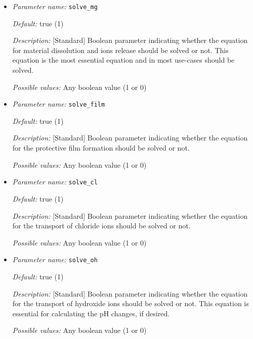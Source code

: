 \begin{itemize}
\item {\it Parameter name:} {\tt solve\_mg}
\label{parameters:solve_mg}


{\it Default:} true (1)

{\it Description:} [Standard] Boolean parameter indicating whether the equation for material dissolution and ions release should be solved or not. This equation is the most essential equation and in most use-cases should be solved.

{\it Possible values:} Any boolean value (1 or 0)


\item {\it Parameter name:} {\tt solve\_film}
\label{parameters:solve_film}


{\it Default:} true (1)

{\it Description:} [Standard] Boolean parameter indicating whether the equation for the protective film formation should be solved or not.

{\it Possible values:} Any boolean value (1 or 0)


\item {\it Parameter name:} {\tt solve\_cl}
\label{parameters:solve_cl}


{\it Default:} true (1)

{\it Description:} [Standard] Boolean parameter indicating whether the equation for the transport of chloride ions should be solved or not.

{\it Possible values:} Any boolean value (1 or 0)


\item {\it Parameter name:} {\tt solve\_oh}
\label{parameters:solve_oh}


{\it Default:} true (1)

{\it Description:} [Standard] Boolean parameter indicating whether the equation for the transport of hydroxide ions should be solved or not. This equation is essential for calculating the pH changes, if desired.

{\it Possible values:} Any boolean value (1 or 0)



\end{itemize}
